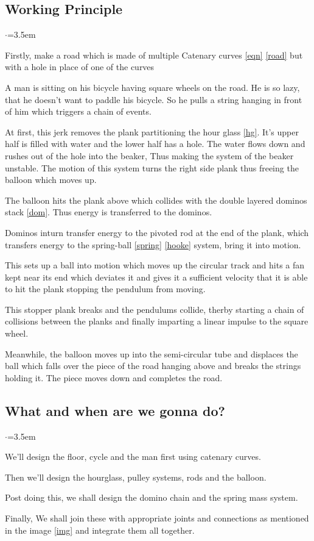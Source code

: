 \documentclass[12pt,a4paper]{article}
\begin{document}
\subsection{Working Principle} \label{work}
\begin{list}{$\cdot$}{\leftmargin=3.5em}
\item Firstly, make a road which is made of multiple Catenary curves \ref{eqn} \ref{road} but with a hole in place of one of the curves
\item A man is sitting on his bicycle having square wheels on the road. He is so lazy, that he doesn't want to paddle his bicycle. So he pulls a string hanging in front of him which triggers a chain of events.
\item At first, this jerk removes the plank partitioning the hour glass \ref{hg}. It's upper half is filled with water and the lower half has a hole. The water flows down and rushes out of the hole into the beaker, Thus making the system of the beaker unstable. The motion of this system turns the right side plank thus freeing the balloon which moves up.
\item The balloon hits the plank above which collides with the double layered dominos stack \ref{dom}. Thus energy is transferred to the dominos.
\item Dominos inturn transfer energy to the pivoted rod at the end of the plank, which transfers energy to the spring-ball \ref{spring} \ref{hooke} system, bring it into motion.
\item This sets up a ball into motion which moves up the circular track and hits a fan kept near its end which deviates it and gives it a sufficient velocity that it is able to hit the plank stopping the pendulum from moving.
\item This stopper plank breaks and the pendulums collide, therby starting a chain of collisions between the planks and finally imparting a linear impulse to the square wheel.
\item Meanwhile, the balloon moves up into the semi-circular tube and displaces the ball which falls over the piece of the road hanging above and breaks the strings holding it. The piece moves down and completes the road.
\end{list}

\subsection{What and when are we gonna do?} \label{what}
\begin{list}{$\cdot$}{\leftmargin=3.5em}
\item We'll design the floor, cycle and the man first using catenary curves.
\item Then we'll design the hourglass, pulley systems, rods and the balloon.
\item Post doing this, we shall design the domino chain and the spring mass system.
\item Finally, We shall join these with appropriate joints and connections as mentioned in the image \ref{img} and integrate them all together.    
\end{list}
\end{document}
